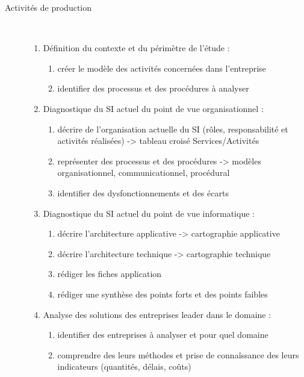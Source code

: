 \begin{enumerate}
\begin{description}
      \item[Activités de production] \hfill \\
          \begin{enumerate}
            \item Définition du contexte et du périmètre de l'étude :
                \begin{enumerate}
                  \item créer le modèle des activités concernées dans l'entreprise
                  \item  identifier des processus et des procédures à analyser
                \end{enumerate}
            \item Diagnostique du SI actuel du point de vue organisationnel : 
                \begin{enumerate}
                  \item décrire de l'organisation actuelle du SI (rôles, responsabilité et activités réalisées) -> tableau croisé Services/Activités 
                  \item représenter des processus et des procédures -> modèles organisationnel, communicationnel, procédural 
                  \item identifier des dysfonctionnements et des écarts
                \end{enumerate}
            \item Diagnostique du SI actuel du point de vue informatique : 
                \begin{enumerate}
                  \item décrire l'architecture applicative -> cartographie applicative
                  \item décrire l'architecture technique -> cartographie technique 
                  \item rédiger les fiches application
                  \item rédiger une synthèse des points forts et des points faibles
                \end{enumerate}
            \item Analyse des solutions des entreprises leader dans le domaine : 
                \begin{enumerate}
                  \item identifier des entreprises à analyser et pour quel domaine 
                  \item comprendre des leurs méthodes et prise de connaîssance des leurs indicateurs (quantités, délais, coûts) 

\end{enumerate}
\end{enumerate}
\end{description}
\end{enumerate}
